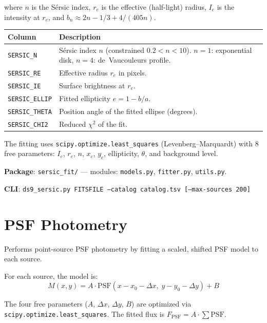 \documentclass[11pt,fleqn]{book}
\begin{document}
where $n$ is the S\'ersic index, $r_e$ is the effective (half-light) radius, $I_e$ is the intensity at $r_e$, and $b_n \approx 2n - 1/3 + 4/(405n)$.

\begin{center}
\begin{longtable}{L{3.2cm} L{9.0cm}}
\toprule
\textbf{Column} & \textbf{Description} \\
\midrule
\endhead
\texttt{SERSIC\_N} & S\'ersic index $n$ (constrained $0.2 < n < 10$). $n=1$: exponential disk, $n=4$: de~Vaucouleurs profile. \\
\midrule
\texttt{SERSIC\_RE} & Effective radius $r_e$ in pixels. \\
\midrule
\texttt{SERSIC\_IE} & Surface brightness at $r_e$. \\
\midrule
\texttt{SERSIC\_ELLIP} & Fitted ellipticity $e = 1 - b/a$. \\
\midrule
\texttt{SERSIC\_THETA} & Position angle of the fitted ellipse (degrees). \\
\midrule
\texttt{SERSIC\_CHI2} & Reduced $\chi^2$ of the fit. \\
\bottomrule
\end{longtable}
\end{center}

The fitting uses \texttt{scipy.optimize.least\_squares} (Levenberg--Marquardt) with 8 free parameters: $I_e$, $r_e$, $n$, $x_c$, $y_c$, ellipticity, $\theta$, and background level.

\textbf{Package}: \texttt{sersic\_fit/} --- modules: \texttt{models.py}, \texttt{fitter.py}, \texttt{utils.py}.

\textbf{CLI}: \texttt{ds9\_sersic.py FITSFILE --catalog catalog.tsv [--max-sources 200]}


\section{PSF Photometry}

Performs point-source PSF photometry by fitting a scaled, shifted PSF model to each source.

For each source, the model is:
\begin{equation}
M(x,y) = A \cdot \text{PSF}(x - x_0 - \Delta x,\; y - y_0 - \Delta y) + B
\end{equation}

The four free parameters ($A$, $\Delta x$, $\Delta y$, $B$) are optimized via \texttt{scipy.optimize.least\_squares}. The fitted flux is $F_\text{PSF} = A \cdot \sum\text{PSF}$.
\end{document}
